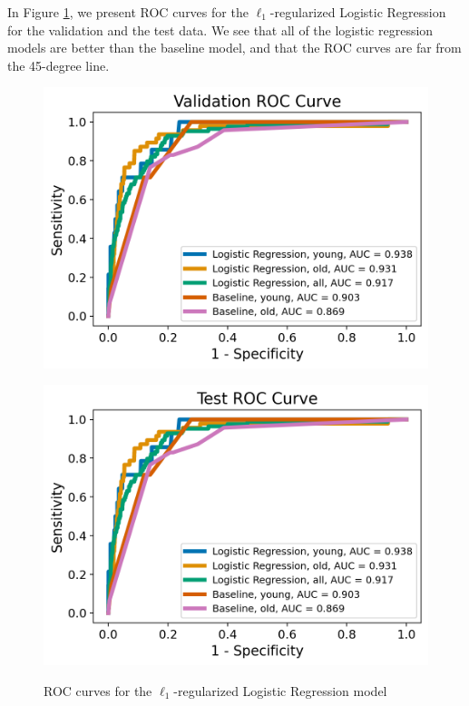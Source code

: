 \documentclass[11pt, letterpaper]{amsart}
\begin{document}
In Figure \ref{fig:lr_roc}, we present ROC curves for the $\ell_1$-regularized Logistic Regression for the validation and the test data. We see that all of the logistic regression models are better than the baseline model, and that the ROC curves are far from the 45-degree line. 
\begin{figure}
	\begin{minipage}[b]{0.5\linewidth}
		\centering
		\includegraphics[width=\textwidth]{lr_val_roc.png}
		\label{fig:lr_val_roc}
	\end{minipage}%
	\begin{minipage}[b]{0.5\linewidth}
		\centering
		\includegraphics[width=\textwidth]{lr_test_roc.png}
		\label{fig:lr_test_roc}
	\end{minipage}
	\caption{ROC curves for the $\ell_1$-regularized Logistic Regression model}\label{fig:lr_roc}
\end{figure}
\end{document}
